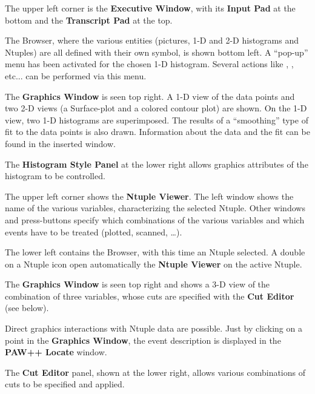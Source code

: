 {\samepage \clearpage \begin{UL}\item The upper left corner is the \PAWPP{} {\bf Executive Window}, with its {\bf Input Pad}
      at the bottom and the {\bf Transcript Pad} at the top.
\item The \PAWPP{} Browser, where the various entities (pictures, 1-D and
      2-D histograms and Ntuples) are all defined with their own symbol,
      is shown bottom left.  A ``pop-up'' menu has been activated for the 
      chosen 1-D histogram. Several actions like , ,
       etc... can be performed via this menu.
\item The {\bf Graphics Window} is seen top right. 
      A 1-D view of the data points and two 2-D views (a Surface-plot and a 
      colored contour plot) are shown.
      On the 1-D view, two 1-D histograms are 
      superimposed. The results of a ``smoothing'' type of fit to the data 
      points is also drawn. Information about the data and the fit can be found
      in the inserted window.
\item The {\bf Histogram Style Panel} at the lower right allows graphics
      attributes of the histogram to be controlled.
\end{UL}
}


\newpage

{\samepage \clearpage \begin{UL}\item The upper left corner shows the {\bf Ntuple Viewer}.
      The left window shows the name of the various variables, characterizing
      the selected Ntuple. Other windows and press-buttons specify which
      combinations of the various variables and which events
      have to be treated (plotted, scanned, \ldots).
\item The lower left contains the \PAWPP{} Browser, with this time an Ntuple
      selected. A double on a Ntuple icon
      open automatically the {\bf Ntuple Viewer} on the active Ntuple.
\item The {\bf Graphics Window} is seen top right and shows a 3-D view
      of the combination of three variables, whose cuts are
      specified with the {\bf Cut Editor} (see below).
\item Direct graphics interactions with Ntuple data are possible. Just
      by clicking on a point in the  {\bf Graphics Window}, the event description is displayed
      in the {\bf PAW++ Locate} window.
\item The {\bf Cut Editor} panel, shown at the lower right, allows
      various combinations of cuts to be specified and applied.
\end{UL}
}


